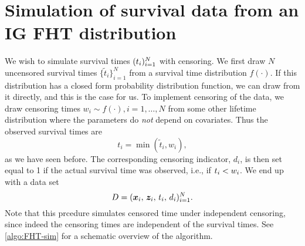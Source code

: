 \section{Simulation of survival data from an IG FHT distribution}\label{sec:simulate-IG-data}
We wish to simulate survival times $(t_{i})_{i=1}^N$ with censoring.
We first draw $N$ uncensored survival times $\{\tilde{t}_i\}_{i=1}^N$ from a survival time distribution $f(\cdot)$.
If this distribution has a closed form probability distribution function, we can draw from it directly, and this is the case for us.
To implement censoring of the data, we draw censoring times $w_i\sim f(\cdot),i=1,\ldots,N$ from some other lifetime distribution where the parameters do \textit{not} depend on covariates.
Thus the observed survival times are
\begin{equation}
    t_i=\min(\tilde{t}_i,w_i),
\end{equation}
as we have seen before.
The corresponding censoring indicator, $d_i$, is then set equal to 1 if the actual survival time was observed, i.e., if $t_{i}<w_i$.
We end up with a data set
\begin{equation}
    D=(\bm{x}_i,\,\bm{z}_i,\,t_i,\,d_i)_{i=1}^N.
\end{equation}
Note that this prcedure simulates censored time under independent censoring, since indeed the censoring times are independent of the survival times.
See \ref{algo:FHT-sim} for a schematic overview of the algorithm.

